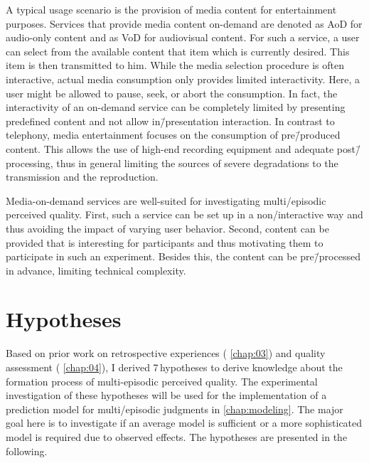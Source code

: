 A typical usage scenario is the provision of media content for entertainment purposes.
Services that provide media content on-demand are denoted as \acf{AoD} for audio-only content and as \acf{VoD} for audiovisual content.
For such a service, a user can select from the available content that item which is currently desired.
This item is then transmitted to him.
While the media selection procedure is often interactive, actual media consumption only provides limited interactivity.
Here, a user might be allowed to pause, seek, or abort the consumption.
In fact, the interactivity of an on-demand service can be completely limited by presenting predefined content and not allow in\=/presentation interaction.
In contrast to telephony, media entertainment focuses on the consumption of pre\=/produced content.
This allows the use of high-end recording equipment and adequate post\=/processing, thus in general limiting the sources of severe degradations to the transmission and the reproduction.

Media-on-demand services are well-suited for investigating multi\-/episodic perceived quality.
First, such a service can be set up in a non\-/interactive way and thus avoiding the impact of varying user behavior.
Second, content can be provided that is interesting for participants and thus motivating them to participate in such an experiment.
Besides this, the content can be pre\=/processed in advance, limiting technical complexity.

\section{Hypotheses}
Based on prior work on retrospective experiences (\cf{} \autoref{chap:03}) and quality assessment (\cf{} \autoref{chap:04}), I derived 7\,hypotheses to derive knowledge about the formation process of multi-episodic perceived quality.
The experimental investigation of these hypotheses will be used for the implementation of a prediction model for multi\-/episodic judgments in \autoref{chap:modeling}.
The major goal here is to investigate if an average model is sufficient or a more sophisticated model is required due to observed effects.
The hypotheses are presented in the following.

